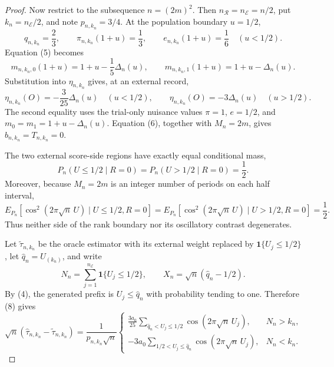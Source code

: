 \documentclass{article}
\begin{document}
\begin{proof}
Now restrict to the subsequence \(n=(2m)^2\).  Then \(n_{\mathcal R}=n_{\mathcal E}=n/2\), put \(k_n=n_{\mathcal E}/2\), and note \(p_{n,k_n}=3/4\).  At the population boundary \(u=1/2\),
\[
 q_{n,k_n}=\frac23,
 \qquad \pi_{n,k_n}(1+u)=\frac13,
 \qquad e_{n,k_n}(1+u)=\frac16
 \quad (u<1/2).
\]
Equation (5) becomes
\[
 m_{n,k_n,0}(1+u)=1+u-\frac15\Delta_n(u),
 \qquad
 m_{n,k_n,1}(1+u)=1+u-\Delta_n(u).
\]
Substitution into \(\eta_{n,k_n}\) gives, at an external record,
\[
 \eta_{n,k_n}(O)=-\frac3{25}\Delta_n(u)\quad(u<1/2),
 \qquad
 \eta_{n,k_n}(O)=-3\Delta_n(u)\quad(u>1/2).
\tag{8}
\]
The second equality uses the trial-only nuisance values \(\pi=1\), \(e=1/2\), and \(m_0=m_1=1+u-\Delta_n(u)\).  Equation (6), together with \(M_n=2m\), gives \(b_{n,k_n}=T_{n,k_n}=0\).

The two external score-side regions have exactly equal conditional mass,
\[
 P_n(U\leq1/2\mid R=0)=P_n(U>1/2\mid R=0)=\frac12.
\tag{9}
\]
Moreover, because \(M_n=2m\) is an integer number of periods on each half interval,
\[
 E_{P_n}[\cos^2(2\pi\sqrt n\,U)\mid U\leq1/2,R=0]
 =E_{P_n}[\cos^2(2\pi\sqrt n\,U)\mid U>1/2,R=0]
 =\frac12.
\tag{10}
\]
Thus neither side of the rank boundary nor its oscillatory contrast degenerates.

Let \(\widetilde\tau_{n,k_n}\) be the oracle estimator with its external weight replaced by \(\mathbf1\{U_j\leq1/2\}\), let \(\widehat q_n=U_{(k_n)}\), and write
\[
 N_n=\sum_{j=1}^{n_{\mathcal E}}\mathbf1\{U_j\leq1/2\},
 \qquad X_n=\sqrt n(\widehat q_n-1/2).
\]
By (4), the generated prefix is \(U_j\leq\widehat q_n\) with probability tending to one.  Therefore (8) gives
\[
 \sqrt n(\widehat\tau_{n,k_n}-\widetilde\tau_{n,k_n})
 =\frac1{p_{n,k_n}\sqrt n}
 \begin{cases}
 \displaystyle \frac{3a_0}{25}
 \sum_{\widehat q_n<U_j\leq1/2}
 \cos(2\pi\sqrt n\,U_j),&N_n>k_n,\\[6pt]
 \displaystyle -3a_0
 \sum_{1/2<U_j\leq\widehat q_n}
 \cos(2\pi\sqrt n\,U_j),&N_n<k_n.
 \end{cases}
\tag{11}
\]


\end{proof}
\end{document}
